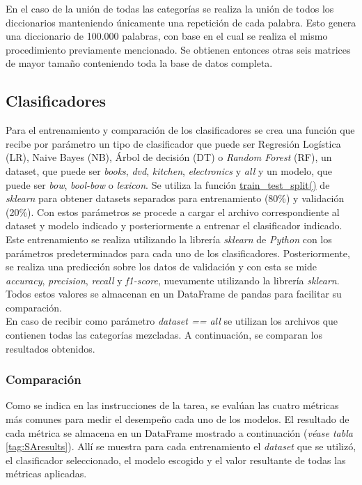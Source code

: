 En el caso de la unión de todas las categorías se realiza la unión de todos los diccionarios manteniendo únicamente una repetición de cada palabra. Esto genera una diccionario de 100.000 palabras, con base en el cual se realiza el mismo procedimiento previamente mencionado. Se obtienen entonces otras seis matrices de mayor tamaño conteniendo toda la base de datos completa.

\subsection{Clasificadores}
Para el entrenamiento y comparación de los clasificadores se crea una función que recibe por parámetro un tipo de clasificador que puede ser Regresión Logística (LR), Naive Bayes (NB), Árbol de decisión (DT) o \textit{Random Forest} (RF), un dataset, que puede ser \textit{books}, \textit{dvd}, \textit{kitchen}, \textit{electronics} y \textit{all} y un modelo, que puede ser \textit{bow}, \textit{bool-bow} o \textit{lexicon}. Se utiliza la función \url{train\_test\_split()} de \textit{sklearn}  para obtener datasets separados para entrenamiento (80\%) y validación (20\%). Con estos parámetros se procede a cargar el archivo correspondiente al dataset y modelo indicado y posteriormente a entrenar el clasificador indicado.\\

Este entrenamiento se realiza utilizando la librería \textit{sklearn} de \textit{Python} con los parámetros predeterminados para cada uno de los clasificadores. Posteriormente, se realiza una predicción sobre los datos de validación y con esta se mide \textit{accuracy}, \textit{precision}, \textit{recall} y \textit{f1-score}, nuevamente utilizando la librería \textit{sklearn}. Todos estos valores se almacenan en un DataFrame de pandas para facilitar su comparación.\\

En caso de recibir como parámetro \textit{dataset == all} se utilizan los archivos que contienen todas las categorías mezcladas. A continuación, se comparan los resultados obtenidos.

\subsubsection{Comparación}
Como se indica en las instrucciones de la tarea, se evalúan las cuatro métricas más comunes para medir el desempeño cada uno de los modelos. El resultado de cada métrica se almacena en un DataFrame mostrado a continuación (\textit{véase tabla} \ref{tag:SAresults}). Allí se muestra para cada entrenamiento el \textit{dataset} que se utilizó, el clasificador seleccionado, el modelo escogido y el valor resultante de todas las métricas aplicadas.

